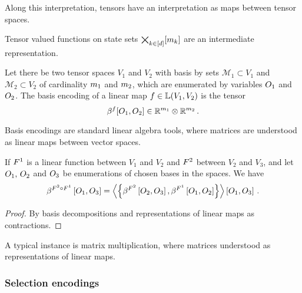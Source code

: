 Along this interpretation, tensors have an interpretation as maps between tensor spaces.


Tensor valued functions on state sets $\bigtimes_{k\in[d]}[m_{k}]$ are an intermediate representation.

\begin{definition}
	Let there be two tensor spaces $V_1$ and $V_2$ with basis by sets $\mathcal{M}_1\subset V_1$ and $\mathcal{M}_2\subset V_2$ of cardinality $m_{1}$ and $m_{2}$, which are enumerated by variables $O_{1}$ and $O_{2}$.
	The basis encoding of a linear map $f\in\mathbb{L}(V_1,V_2)$ is the tensor
		\[ \beta^{f}[O_{1},O_{2}] \in \mathbb{R}^{m_{1}} \otimes \mathbb{R}^{m_{2}} \, . \] 
\end{definition}

Basis encodings are standard linear algebra tools, where matrices are understood as linear maps between vector spaces.

\begin{theorem}\label{the:linearCompositionBasisEncoding}
	If $F^{1}$ is a linear function between $V_1$ and $V_2$  and $F^{2}$ between $V_2$ and $V_3$, and let $O_{1},\,O_{2}$ and $O_{3}$ be enumerations of chosen bases in the spaces.
	We have
	\begin{align*}
		\beta^{F^{2}\circ F^{1}}\left[O_{1},O_{3}\right] 
		= \left\langle \left\{
		\beta^{F^{2}}\left[O_{2},O_{3}\right], \beta^{F^{1}}\left[O_{1},O_{2}\right]
		\right\}\right\rangle \left[ O_{1},O_{3} \right]  \, . 
	\end{align*}
\end{theorem}
\begin{proof}
	By basis decompositions and representations of linear maps as contractions.
\end{proof}

A typical instance is matrix multiplication, where matrices understood as representations of linear maps.


\subsubsection{Selection encodings}

